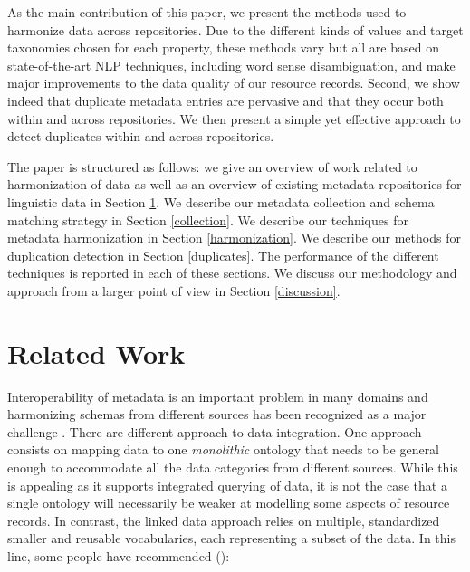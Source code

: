 \documentclass[11pt]{article}
\begin{document}

As the main contribution of this paper, we present the methods used to harmonize
data across repositories. Due to the different kinds of values and target
taxonomies chosen for each property, these methods vary but all are based on
state-of-the-art NLP techniques, including word sense disambiguation, and make
major improvements to the data quality of our resource records.
Second, we show indeed that duplicate metadata entries are pervasive and that they occur both within and across repositories. We then present a simple yet effective approach to detect duplicates within and across repositories. 

The paper is structured as follows: we give an overview of work related to harmonization of data as well as an overview of existing metadata repositories for linguistic data in Section \ref{rel_work}. We describe our metadata collection and schema matching strategy in Section \ref{collection}. We describe our techniques for metadata harmonization in Section \ref{harmonization}. We describe our methods for duplication detection in Section \ref{duplicates}. The performance of the different techniques is reported in each of these sections. We discuss our methodology and approach from a larger point of view in Section \ref{discussion}. 


\section{Related Work}

\label{rel_work}

Interoperability of metadata is an important problem in many domains and harmonizing schemas from different sources has been recognized as a major challenge 
\cite{nilsson2010interoperability,khoo2010merging,nogueras2004metadata}. 
There are different approach to data integration. One approach consists on
mapping data to one \emph{monolithic} ontology that needs to be general enough
to accommodate all the data categories from different sources. While this is 
appealing as it supports integrated querying of data, it is not the case that a
single ontology will necessarily be weaker at modelling some aspects of resource
records. In contrast, the linked data approach relies on
multiple, standardized smaller and reusable vocabularies, each representing a 
subset of the data.  In this line, some people have recommended (\cite{brooks2006towards}):
\end{document}
